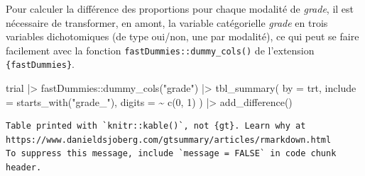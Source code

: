 \documentclass[
  letterpaper,
  DIV=11,
  numbers=noendperiod,
  oneside]{scrreprt}
\newenvironment{Shaded}{\begin{snugshade}}{\end{snugshade}}
\newcommand{\AttributeTok}[1]{\textcolor[rgb]{0.40,0.45,0.13}{#1}}
\newcommand{\DecValTok}[1]{\textcolor[rgb]{0.68,0.00,0.00}{#1}}
\newcommand{\FunctionTok}[1]{\textcolor[rgb]{0.28,0.35,0.67}{#1}}
\newcommand{\NormalTok}[1]{\textcolor[rgb]{0.00,0.23,0.31}{#1}}
\newcommand{\SpecialCharTok}[1]{\textcolor[rgb]{0.37,0.37,0.37}{#1}}
\newcommand{\StringTok}[1]{\textcolor[rgb]{0.13,0.47,0.30}{#1}}
\begin{document}
Pour calculer la différence des proportions pour chaque modalité de
\emph{grade}, il est nécessaire de transformer, en amont, la variable
catégorielle \emph{grade} en trois variables dichotomiques (de type
oui/non, une par modalité), ce qui peut se faire facilement avec la
fonction \texttt{fastDummies::dummy\_cols()} de l'extension
\texttt{\{fastDummies\}}.

\begin{Shaded}
\begin{Highlighting}[]
\NormalTok{trial }\SpecialCharTok{|\textgreater{}} 
\NormalTok{  fastDummies}\SpecialCharTok{::}\FunctionTok{dummy\_cols}\NormalTok{(}\StringTok{"grade"}\NormalTok{) }\SpecialCharTok{|\textgreater{}} 
  \FunctionTok{tbl\_summary}\NormalTok{(}
    \AttributeTok{by =}\NormalTok{ trt,}
    \AttributeTok{include =} \FunctionTok{starts\_with}\NormalTok{(}\StringTok{"grade\_"}\NormalTok{),}
    \AttributeTok{digits =} \SpecialCharTok{\textasciitilde{}} \FunctionTok{c}\NormalTok{(}\DecValTok{0}\NormalTok{, }\DecValTok{1}\NormalTok{)}
\NormalTok{  ) }\SpecialCharTok{|\textgreater{}} 
  \FunctionTok{add\_difference}\NormalTok{()}
\end{Highlighting}
\end{Shaded}

\begin{verbatim}
Table printed with `knitr::kable()`, not {gt}. Learn why at
https://www.danieldsjoberg.com/gtsummary/articles/rmarkdown.html
To suppress this message, include `message = FALSE` in code chunk header.
\end{verbatim}
\end{document}
